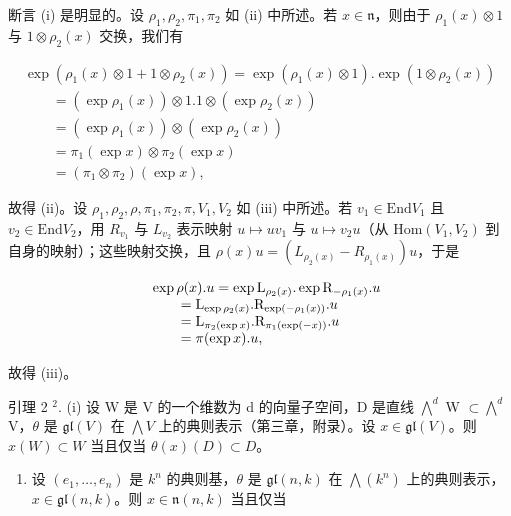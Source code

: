断言 (i) 是明显的。设 \(\rho_1, \rho_2, \pi_1, \pi_2\) 如 (ii) 中所述。若 \(x \in \mathfrak{n}\)，则由于 \(\rho_1(x) \otimes 1\) 与 \(1 \otimes \rho_2(x)\) 交换，我们有

\[
\begin{array}{l} \exp (\rho_ {1} (x) \otimes 1 + 1 \otimes \rho_ {2} (x)) = \exp (\rho_ {1} (x) \otimes 1). \exp (1 \otimes \rho_ {2} (x)) \\ \qquad = (\exp \rho_ {1} (x)) \otimes 1. 1 \otimes (\exp \rho_ {2} (x)) \\ \qquad = (\exp \rho_ {1} (x)) \otimes (\exp \rho_ {2} (x)) \\ \qquad = \pi_ {1} (\exp x) \otimes \pi_ {2} (\exp x) \\ \qquad = (\pi_ {1} \otimes \pi_ {2}) (\exp x), \end{array}
\]

故得 (ii)。设 \(\rho_1, \rho_2, \rho, \pi_1, \pi_2, \pi, V_1, V_2\) 如 (iii) 中所述。若 \(v_1 \in \mathrm{End}V_1\) 且 \(v_2 \in \mathrm{End}V_2\)，用 \(R_{v_1}\) 与 \(L_{v_2}\) 表示映射 \(u \mapsto uv_1\) 与 \(u \mapsto v_2u\)（从 \(\mathrm{Hom}(V_1, V_2)\) 到自身的映射）；这些映射交换，且 \(\rho(x)u = (L_{\rho_2(x)} - R_{\rho_1(x)})u\)，于是

\[
\begin{array}{r l} & {\exp \rho (x). u = \exp \mathrm{L} _ {\rho_ {2} (x)}. \exp \mathrm{R} _ {- \rho_ {1} (x)}. u} \\ & {\qquad = \mathrm{L} _ {\exp \rho_ {2} (x)}. \mathrm{R} _ {\exp (- \rho_ {1} (x))}. u} \\ & {\qquad = \mathrm{L} _ {\pi_ {2} (\exp x)}. \mathrm{R} _ {\pi_ {1} (\exp (- x))}. u} \\ & {\qquad = \pi (\exp x). u,} \end{array}
\]

故得 (iii)。

引理 2 \(^{2}\). (i) 设 W 是 V 的一个维数为 d 的向量子空间，D 是直线 \(\bigwedge^{d}\) W \(\subset \bigwedge^{d}\) V，\(\theta\) 是 \(\mathfrak{gl}(V)\) 在 \(\bigwedge V\) 上的典则表示（第三章，附录）。设 \(x \in \mathfrak{gl}(V)\)。则 \(x(W) \subset W\) 当且仅当 \(\theta(x)(D) \subset D\)。

\begin{enumerate}
\def\labelenumi{(\roman{enumi})}
\setcounter{enumi}{1}
\tightlist
\item
  设 \((e_{1},\ldots,e_{n})\) 是 \(k^{n}\) 的典则基，\(\theta\) 是 \(\mathfrak{gl}(n,k)\) 在 \(\bigwedge(k^{n})\) 上的典则表示，\(x\in\mathfrak{gl}(n,k)\)。则 \(x\in\mathfrak{n}(n,k)\) 当且仅当
\end{enumerate}

